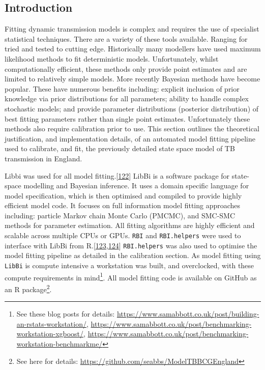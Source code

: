 \documentclass[11pt,twoside]{bristolthesis}
\begin{document}
  \hypertarget{introduction-8}{%
  \subsection{Introduction}\label{introduction-8}}
  
  Fitting dynamic transmission models is complex and requires the use of specialist statistical techniques. There are a variety of these tools available. Ranging for tried and tested to cutting edge. Historically many modellers have used maximum likelihood methods to fit deterministic models. Unfortunately, whilst computationally efficient, these methods only provide point estimates and are limited to relatively simple models. More recently Bayesian methods have become popular. These have numerous benefits including: explicit inclusion of prior knowledge via prior distributions for all parameters; ability to handle complex stochastic models; and provide parameter distributions (posterior distribution) of best fitting parameters rather than single point estimates. Unfortunately these methods also require calibration prior to use. This section outlines the theoretical justification, and implementation details, of an automated model fitting pipeline used to calibrate, and fit, the previously detailed state space model of TB transmission in England.
  
  Libbi was used for all model fitting.{[}\protect\hyperlink{ref-Murray2015}{122}{]} LibBi is a software package for state-space modelling and Bayesian inference. It uses a domain specific language for model specification, which is then optimised and compiled to provide highly efficient model code. It focuses on full information model fitting approaches including: particle Markov chain Monte Carlo (PMCMC), and SMC-SMC methods for parameter estimation. All fitting algorithms are highly efficient and scalable across multiple CPUs or GPUs. \texttt{RBI} and \texttt{RBI.helpers} were used to interface with LibBi from R.{[}\protect\hyperlink{ref-Funk:2019ud}{123},\protect\hyperlink{ref-Funk:2019uw}{124}{]} \texttt{RBI.helpers} was also used to optimise the model fitting pipeline as detailed in the calibration section. As model fitting using \texttt{LibBi} is compute intensive a workstation was built, and overclocked, with these compute requirements in mind\footnote{See these blog posts for details: \url{https://www.samabbott.co.uk/post/building-an-rstats-workstation/}, \url{https://www.samabbott.co.uk/post/benchmarking-workstation-xgboost/}, \url{https://www.samabbott.co.uk/post/benchmarking-workstation-benchmarkme/}}. All model fitting code is available on GitHub as an R package\footnote{See here for details: \url{https://github.com/seabbs/ModelTBBCGEngland}}.
  
\end{document}
